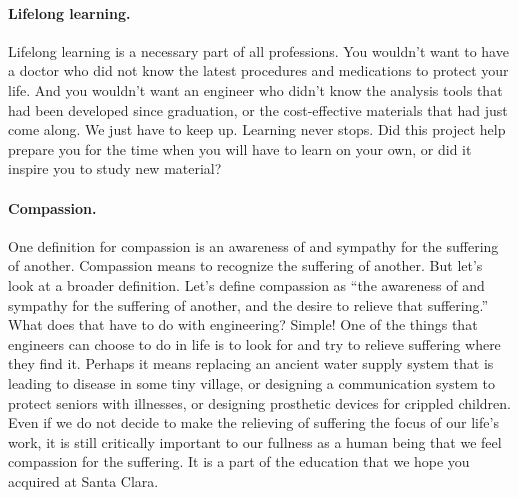 \paragraph{Lifelong learning.}
Lifelong learning is a necessary part of all professions. You wouldn't want to have a doctor who did not know the latest procedures and medications to protect your life. And you wouldn't want an engineer who didn't know the analysis tools that had been developed since graduation, or the cost-effective materials that had just come along. We just have to keep up. Learning never stops. Did this project help prepare you for the time when you will have to learn on your own, or did it inspire you to study new material?

\paragraph{Compassion.}
One definition for compassion is an awareness of and sympathy for the suffering of another. Compassion means to recognize the suffering of another. But let’s look at a broader definition. Let’s define compassion as “the awareness of and sympathy for the suffering of another, and the desire to relieve that suffering.” What does that have to do with engineering? Simple! One of the things that engineers can choose to do in life is to look for and try to relieve suffering where they find it. Perhaps it means replacing an ancient water supply system that is leading to disease in some tiny village, or designing a communication system to protect seniors with illnesses, or designing prosthetic devices for crippled children. Even if we do not decide to make the relieving of suffering the focus of our life’s work, it is still critically important to our fullness as a human being that we feel compassion for the suffering. It is a part of the education that we hope you acquired at Santa Clara.